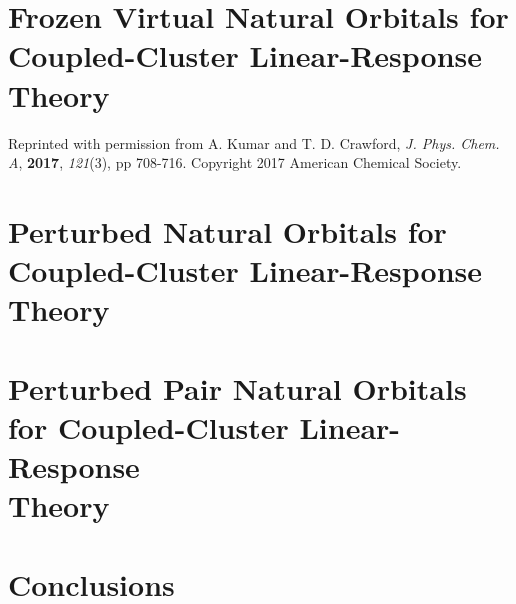 \documentclass[12pt]{report}
\begin{document}
\chapter{Frozen Virtual Natural Orbitals for Coupled-Cluster Linear-Response\\Theory}
Reprinted with permission from A. Kumar and T. D. Crawford, {\em J. Phys. Chem. A}, \textbf{2017}, {\em 121}(3), pp 708-716. Copyright 2017 American Chemical Society.

\chapter{Perturbed Natural Orbitals for Coupled-Cluster Linear-Response Theory}

\chapter{Perturbed Pair Natural Orbitals for Coupled-Cluster Linear-Response\\Theory}

\chapter{Conclusions}

%
%

%



%
\end{document}
